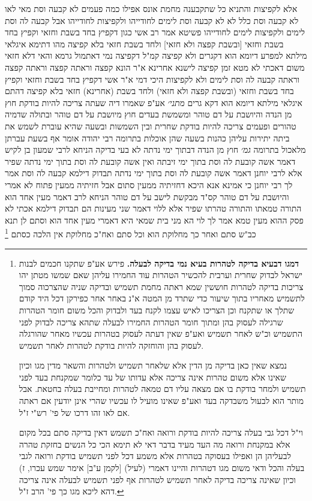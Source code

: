 \documentclass[12pt, openany]{book}
\newcommand{\footnotecomment}[1]{\footnote{#1}}
\newcommand{\commenta}[1]{\footnotecomment{#1}}
\begin{document}
{אלא לקפיצות והתניא  כל שתקבענה מחמת אונס אפילו כמה פעמים לא קבעה וסת  מאי לאו לא קבעה וסת כלל 
לא לא קבעה וסת לימים לחודייהו ולקפיצות לחודייהו אבל קבעה לה וסת לימים ולקפיצות  לימים לחודייהו פשיטא  אמר רב אשי  כגון דקפיץ בחד בשבת וחזאי וקפיץ בחד בשבת וחזאי [ובשבת קפצה ולא חזאי] ולחד בשבת חזאי בלא קפיצה 
מהו דתימא  איגלאי מילתא למפרע דיומא הוא דקגרים ולא קפיצה קמ"ל דקפיצה נמי דאתמול גרמא והאי דלא חזאי משום דאכתי לא מטא זמן קפיצה 
לישנא אחרינא א"ר הונא  קפצה וראתה קפצה וראתה קפצה וראתה קבעה לה וסת לימים ולא לקפיצות  היכי דמי  א"ר אשי  דקפיץ בחד בשבת וחזאי וקפיץ בחד בשבת וחזאי (ובשבת קפצה ולא חזאי) ולחד בשבת (אחרינא) חזאי בלא קפיצה דהתם איגלאי מילתא דיומא הוא דקא גרים
{\large\emph{מתני׳}} אע"פ שאמרו דיה שעתה צריכה להיות בודקת חוץ מן הנדה והיושבת על דם טוהר
ומשמשת בעדים חוץ מיושבת על דם טוהר ובתולה שדמיה טהורים 
ופעמים צריכה להיות בודקת שחרית ובין השמשות ובשעה שהיא עוברת לשמש את ביתה  יתירות עליהן כהנות בשעה שהן אוכלות בתרומה  רבי יהודה אומר  אף בשעת עברתן מלאכול בתרומה
{\large\emph{גמ׳}} חוץ מן הנדה דבתוך ימי נדתה לא בעי בדיקה 
הניחא לרבי שמעון בן לקיש דאמר אשה קובעת לה וסת בתוך ימי זיבתה ואין אשה קובעת לה וסת בתוך ימי נדתה שפיר  אלא לרבי יוחנן דאמר אשה קובעת לה וסת בתוך ימי נדתה תבדוק דילמא קבעה לה וסת
 אמר לך רבי יוחנן  כי אמינא אנא היכא דחזיתיה ממעין סתום אבל חזיתיה ממעין פתוח לא אמרי
והיושבת על דם טוהר קס"ד  מבקשת לישב על דם טוהר 
הניחא לרב דאמר מעין אחד הוא התורה טמאתו והתורה טהרתו שפיר
אלא ללוי דאמר שני מעינות הם תבדוק דילמא אכתי לא פסק ההוא מעין טמא  אמר לך לוי  הא מני
בית שמאי היא דאמרי מעין אחד הוא  וסתם לן תנא כב"ש  סתם ואחר כך מחלוקת הוא וכל סתם ואח"כ מחלוקת אין הלכה כסתם 
\commenta{\textbf{דמגו דבעיא בדיקה לטהרות בעיא נמי בדיקה לבעלה.}  פירש אע"פ שתקנו חכמים לבנות ישראל לבדוק שחרית וערבית להכשיר הטהרות עוד החמירו עליהן שאם שמשו מטתן יהו צריכות בדיקה לטהרות חוששין שמא ראתה מחמת תשמיש ובדיקה שניה שהצרכוה סמוך לתשמיש מאחריו בתוך שיעור כדי שתרד מן המטה א"נ באחר אחר כפירקן דכל היד קודם שתלך או שתקנח וכן הצריכו לאיש עצמו לקנח בעד ולבדוק והכל משום חומר הטהרות שרגילה לעסוק בהן ומתוך חומר הטהרות החמירו לבעלה שתהא צריכה לבדוק לפני התשמיש וכ"ש לאחר תשמיש ואע"פ שאין דעתה לעסוק בטהרות עכשיו מאחר שהורגלה לעסוק בהן והוחזקה להיות בודקת לטהרות לאחר תשמיש.\par  נמצא שאין כאן בדיקה מן הדין אלא שלאחר תשמיש ולטהרות והשאר מדין מגו וכיון שאינו אלא משום טהרות אינה צריכה אלא עדותו של עד כלומר שמקנחת בעד לפני תשמיש ולמחר בודקת בו אם מצאה עליו דם טמאה לטהרות ומחייבת בעלה בחטאת. אבל מותר הוא לבעול משבדקה בעד ואע"פ שאינו מועיל לו עכשיו שהרי אינן יודעין אם ראתה אם לאו זהו דרכו של פי' רש"י ז"ל.\par  וי"ל דכל גבי בעלה צריכה להיות בודקת ורואה ואח"כ תשמש דאין בדיקה סתם בכל מקום אלא במקנחת ורואה מה העד מעיד בדבר דאי לא תימא הכי כל הנשים בחזקת טהרה לבעליהן הן ואפילו בעסוקה בטהרות אלא משמע דכל לפני תשמיש בודקת ורואה לגבי בעלה והכל ודאי משום מגו דטהרות והיינו דאמרי (לעיל) [לקמן ע"ב] אימר שמש עכרו, ז) וכיון שאינה צריכה בדיקה לאחר תשמיש לטהרות אף לפני תשמיש לבעלה אינה צריכה דהא ליכא מגו כך פי' הרב ז"ל. }

}
\end{document}
